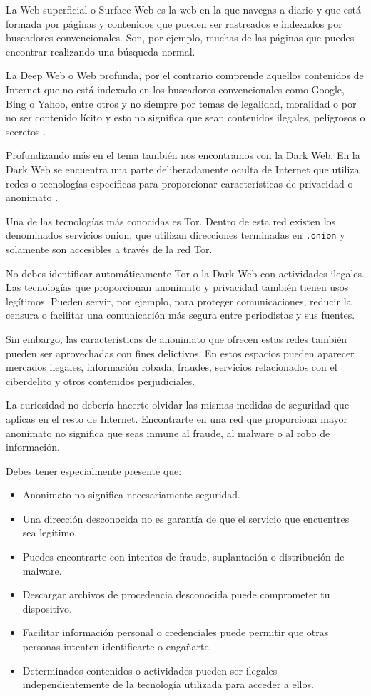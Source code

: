 \documentclass[
  spanish,
  a4paper,
  openany]{book}
\begin{document}
La Web superficial o Surface Web es la web en la que navegas a diario y que está formada por páginas y contenidos que pueden ser rastreados e indexados por buscadores convencionales. Son, por ejemplo, muchas de las páginas que puedes encontrar realizando una búsqueda normal.

La Deep Web o Web profunda, por el contrario comprende aquellos contenidos de Internet que no está indexado en los buscadores convencionales como Google, Bing o Yahoo, entre otros y no siempre por temas de legalidad, moralidad o por no ser contenido lícito y esto no significa que sean contenidos ilegales, peligrosos o secretos \citep{INCIBE-deep-web}.

Profundizando más en el tema también nos encontramos con la Dark Web. En la Dark Web se encuentra una parte deliberadamente oculta de Internet que utiliza redes o tecnologías específicas para proporcionar características de privacidad o anonimato \citep{WIKI-dark-web}.

Una de las tecnologías más conocidas es Tor. Dentro de esta red existen los denominados servicios onion, que utilizan direcciones terminadas en \texttt{.onion} y solamente son accesibles a través de la red Tor.

No debes identificar automáticamente Tor o la Dark Web con actividades ilegales. Las tecnologías que proporcionan anonimato y privacidad también tienen usos legítimos. Pueden servir, por ejemplo, para proteger comunicaciones, reducir la censura o facilitar una comunicación más segura entre periodistas y sus fuentes.

Sin embargo, las características de anonimato que ofrecen estas redes también pueden ser aprovechadas con fines delictivos. En estos espacios pueden aparecer mercados ilegales, información robada, fraudes, servicios relacionados con el ciberdelito y otros contenidos perjudiciales.

La curiosidad no debería hacerte olvidar las mismas medidas de seguridad que aplicas en el resto de Internet. Encontrarte en una red que proporciona mayor anonimato no significa que seas inmune al fraude, al malware o al robo de información.

Debes tener especialmente presente que:

\begin{itemize}
\item
  Anonimato no significa necesariamente seguridad.
\item
  Una dirección desconocida no es garantía de que el servicio que encuentres sea legítimo.
\item
  Puedes encontrarte con intentos de fraude, suplantación o distribución de malware.
\item
  Descargar archivos de procedencia desconocida puede comprometer tu dispositivo.
\item
  Facilitar información personal o credenciales puede permitir que otras personas intenten identificarte o engañarte.
\item
  Determinados contenidos o actividades pueden ser ilegales independientemente de la tecnología utilizada para acceder a ellos.
\end{itemize}
\end{document}
